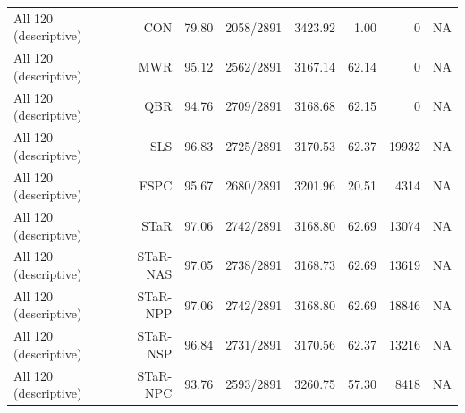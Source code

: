 \begin{center}
{\begin{tabular}{@{}lrrrrrrr@{}}
All 120 (descriptive) & CON & 79.80 & 2058/2891 & 3423.92 & 1.00 & 0 & NA \\
All 120 (descriptive) & MWR & 95.12 & 2562/2891 & 3167.14 & 62.14 & 0 & NA \\
All 120 (descriptive) & QBR & 94.76 & 2709/2891 & 3168.68 & 62.15 & 0 & NA \\
All 120 (descriptive) & SLS & 96.83 & 2725/2891 & 3170.53 & 62.37 & 19932 & NA \\
All 120 (descriptive) & FSPC & 95.67 & 2680/2891 & 3201.96 & 20.51 & 4314 & NA \\
All 120 (descriptive) & STaR & 97.06 & 2742/2891 & 3168.80 & 62.69 & 13074 & NA \\
All 120 (descriptive) & STaR-NAS & 97.05 & 2738/2891 & 3168.73 & 62.69 & 13619 & NA \\
All 120 (descriptive) & STaR-NPP & 97.06 & 2742/2891 & 3168.80 & 62.69 & 18846 & NA \\
All 120 (descriptive) & STaR-NSP & 96.84 & 2731/2891 & 3170.56 & 62.37 & 13216 & NA \\
All 120 (descriptive) & STaR-NPC & 93.76 & 2593/2891 & 3260.75 & 57.30 & 8418 & NA \\
\bottomrule
\end{tabular}
}
\end{center}
\endgroup
